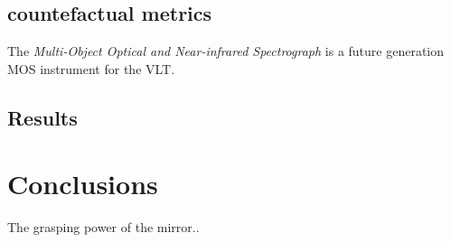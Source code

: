 \documentclass[binding=0.6cm]{sapthesis}
\begin{document}
\section{countefactual metrics}
\label{sec:expRes.cf-metrics}
The \textit{Multi-Object Optical and Near-infrared Spectrograph} is a future generation MOS instrument for the VLT. 

\section{Results}
\label{sec:expRes-res}




\chapter{Conclusions}
\label{chap:5-conclusions} 
The grasping power of the mirror..





\backmatter
\cleardoublepage %

\printbibheading
\printbibliography[type=article,heading=subbibliography,title={Articles}]
\printbibliography[type=inbook,heading=subbibliography,title={Inproceedings}]
\printbibliography[type=book,heading=subbibliography,title={Books}]
\printbibliography[type=misc,heading=subbibliography,title={Miscellaneous}]
\end{document}
